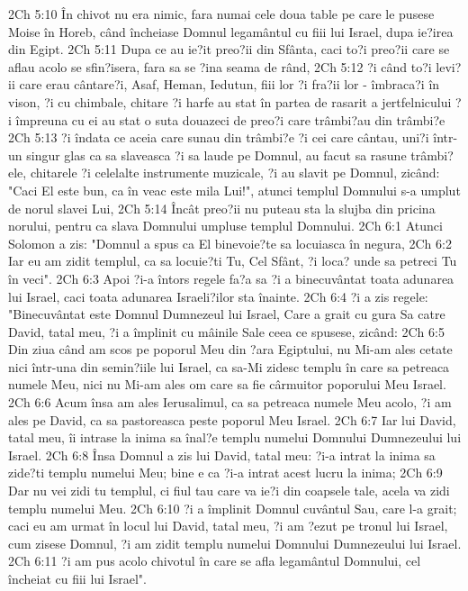 2Ch 5:10  În chivot nu era nimic, fara numai cele doua table pe care le pusese Moise în Horeb, când încheiase Domnul legamântul cu fiii lui Israel, dupa ie?irea din Egipt.
2Ch 5:11  Dupa ce au ie?it preo?ii din Sfânta, caci to?i preo?ii care se aflau acolo se sfin?isera, fara sa se ?ina seama de rând,
2Ch 5:12  ?i când to?i levi?ii care erau cântare?i, Asaf, Heman, Iedutun, fiii lor ?i fra?ii lor - îmbraca?i în vison, ?i cu chimbale, chitare ?i harfe au stat în partea de rasarit a jertfelnicului ?i împreuna cu ei au stat o suta douazeci de preo?i care trâmbi?au din trâmbi?e
2Ch 5:13  ?i îndata ce aceia care sunau din trâmbi?e ?i cei care cântau, uni?i într-un singur glas ca sa slaveasca ?i sa laude pe Domnul, au facut sa rasune trâmbi?ele, chitarele ?i celelalte instrumente muzicale, ?i au slavit pe Domnul, zicând: "Caci El este bun, ca în veac este mila Lui!", atunci templul Domnului s-a umplut de norul slavei Lui,
2Ch 5:14  Încât preo?ii nu puteau sta la slujba din pricina norului, pentru ca slava Domnului umpluse templul Domnului.
2Ch 6:1  Atunci Solomon a zis: "Domnul a spus ca El binevoie?te sa locuiasca în negura,
2Ch 6:2  Iar eu am zidit templul, ca sa locuie?ti Tu, Cel Sfânt, ?i loca? unde sa petreci Tu în veci".
2Ch 6:3  Apoi ?i-a întors regele fa?a sa ?i a binecuvântat toata adunarea lui Israel, caci toata adunarea Israeli?ilor sta înainte.
2Ch 6:4  ?i a zis regele: "Binecuvântat este Domnul Dumnezeul lui Israel, Care a grait cu gura Sa catre David, tatal meu, ?i a împlinit cu mâinile Sale ceea ce spusese, zicând:
2Ch 6:5  Din ziua când am scos pe poporul Meu din ?ara Egiptului, nu Mi-am ales cetate nici într-una din semin?iile lui Israel, ca sa-Mi zidesc templu în care sa petreaca numele Meu, nici nu Mi-am ales om care sa fie cârmuitor poporului Meu Israel.
2Ch 6:6  Acum însa am ales Ierusalimul, ca sa petreaca numele Meu acolo, ?i am ales pe David, ca sa pastoreasca peste poporul Meu Israel.
2Ch 6:7  Iar lui David, tatal meu, îi intrase la inima sa înal?e templu numelui Domnului Dumnezeului lui Israel.
2Ch 6:8  Însa Domnul a zis lui David, tatal meu: ?i-a intrat la inima sa zide?ti templu numelui Meu; bine e ca ?i-a intrat acest lucru la inima;
2Ch 6:9  Dar nu vei zidi tu templul, ci fiul tau care va ie?i din coapsele tale, acela va zidi templu numelui Meu.
2Ch 6:10  ?i a împlinit Domnul cuvântul Sau, care l-a grait; caci eu am urmat în locul lui David, tatal meu, ?i am ?ezut pe tronul lui Israel, cum zisese Domnul, ?i am zidit templu numelui Domnului Dumnezeului lui Israel.
2Ch 6:11  ?i am pus acolo chivotul în care se afla legamântul Domnului, cel încheiat cu fiii lui Israel".

